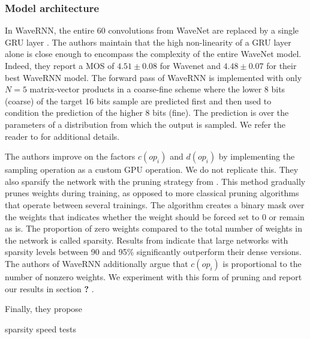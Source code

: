 \documentclass[a4paper, oneside, 12pt, english]{article}
\newcommand{\rw}{\color{red}\textbf{?} \color{black}}		%
\begin{document}
\subsubsection{Model architecture}
In WaveRNN, the entire 60 convolutions from WaveNet are replaced by a single GRU layer \citep{GRU}. The authors maintain that the high non-linearity of a GRU layer alone is close enough to encompass the complexity of the entire WaveNet model. Indeed, they report a MOS of $4.51 \pm 0.08$ for Wavenet and $4.48 \pm 0.07$ for their best WaveRNN model. The forward pass of WaveRNN is implemented with only $N = 5$ matrix-vector products in a coarse-fine scheme where the lower 8 bits (coarse) of the target 16 bits sample are predicted first and then used to condition the prediction of the higher 8 bits (fine). The prediction is over the parameters of a distribution from which the output is sampled. We refer the reader to \citep{WaveRNN} for additional details.

The authors improve on the factors $c(op_i)$ and $d(op_i)$ by implementing the sampling operation as a custom GPU operation. We do not replicate this. They also sparsify the network with the pruning strategy from \citep{SparsityRNN, 2PruneOrNot2Prune}. This method gradually prunes weights during training, as opposed to more classical pruning algorithms that operate between several trainings. The algorithm creates a binary mask over the weights that indicates whether the weight should be forced set to 0 or remain as is. The proportion of zero weights compared to the total number of weights in the network is called sparsity. Results from \citep{SparsityRNN, 2PruneOrNot2Prune} indicate that large networks with sparsity levels between 90 and 95\% significantly outperform their dense versions. The authors of WaveRNN additionally argue that $c(op_i)$ is proportional to the number of nonzero weights. We experiment with this form of pruning and report our results in section \rw.

Finally, they propose 




\color{red} sparsity speed tests \color{black}

\clearpage

 
\end{document}
